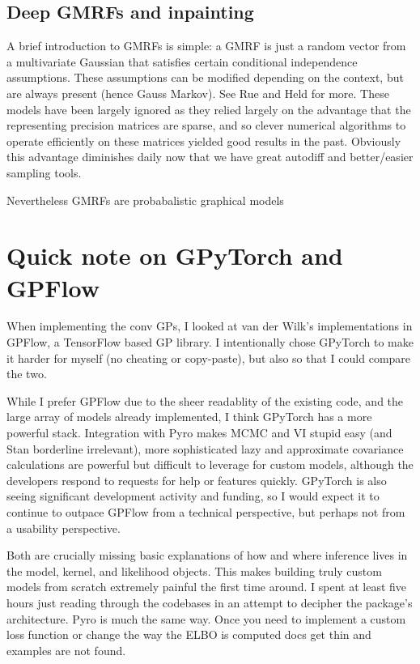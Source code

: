 \documentclass{article}
\begin{document}
\subsection{Deep GMRFs and inpainting}
A brief introduction to GMRFs is simple: a GMRF is just a random vector from
a multivariate Gaussian that satisfies certain conditional independence assumptions.
These assumptions can be modified depending on the context, but are always present
(hence Gauss Markov). See Rue and Held for more\cite{gmrf}. These models have been largely ignored as they relied largely
on the advantage that the representing precision matrices are sparse, and so
clever numerical algorithms to operate efficiently on these matrices yielded
good results in the past. Obviously this advantage diminishes daily now that
we have great autodiff and better/easier sampling tools.

Nevertheless GMRFs are probabalistic graphical models

\section{Quick note on GPyTorch and GPFlow}
When implementing the conv GPs, I looked at van der Wilk's implementations in
GPFlow, a TensorFlow based GP library. I intentionally chose GPyTorch to make
it harder for myself (no cheating or copy-paste), but also so that I could compare the two.

While I prefer GPFlow due to the sheer readablity of the
existing code, and the large array of models already implemented, I think GPyTorch
has a more powerful stack. Integration with Pyro makes MCMC and VI stupid easy (and Stan borderline irrelevant), more sophisticated lazy and approximate covariance calculations are powerful but difficult to leverage for custom models, although the developers respond to requests for help or features quickly.
GPyTorch is also seeing significant development activity and funding, so I would expect
it to continue to outpace GPFlow from a technical perspective, but perhaps not from
a usability perspective.

Both are crucially missing basic explanations of how and where inference lives in
the model, kernel, and likelihood objects. This makes building truly custom models from scratch
extremely painful the first time around. I spent at least five hours just reading
through the codebases in an attempt to decipher the package's architecture.
Pyro is much the same way. Once you need to implement a custom loss function or
change the way the ELBO is computed docs get thin and examples are not found.

\nocite{*}


\end{document}
